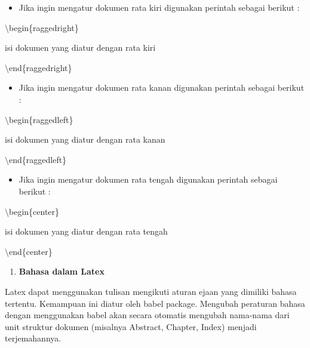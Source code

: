 \begin{itemize}
\item Jika ingin mengatur dokumen rata kiri digunakan perintah sebagai berikut :
\end{itemize}
\hspace{0,5in}$\setminus$begin\{raggedright\}

\hspace{0,5in}isi dokumen yang diatur dengan rata kiri

\hspace{0,5in}$\setminus$end\{raggedright\}

\begin{itemize}
\item Jika ingin mengatur dokumen rata kanan digunakan perintah sebagai berikut :
\end{itemize}
\hspace{0,5in}$\setminus$begin\{raggedleft\}

\hspace{0,5in}isi dokumen yang diatur dengan rata kanan

\hspace{0,5in}$\setminus$end\{raggedleft\}

\begin{itemize}
\item Jika ingin mengatur dokumen rata tengah digunakan perintah sebagai berikut :
\end{itemize}
\hspace{0,5in}$\setminus$begin\{center\}

\hspace{0,5in}isi dokumen yang diatur dengan rata tengah

\hspace{0,5in}$\setminus$end\{center\}

\begin{enumerate}
\setcounter{enumi}{\thenumberedCntB}
\item \textbf{Bahasa dalam Latex}
\setcounter{numberedCntB}{\theenumi}
\end{enumerate}
\hspace{0,5in}Latex dapat menggunakan tulisan mengikuti aturan ejaan yang dimiliki bahasa tertentu. Kemampuan ini diatur oleh babel package. Mengubah peraturan bahasa dengan menggunakan babel akan secara otomatis mengubah nama-nama dari unit struktur dokumen (misalnya Abstract, Chapter, Index) 
menjadi terjemahannya.\par \vspace{12pt}

